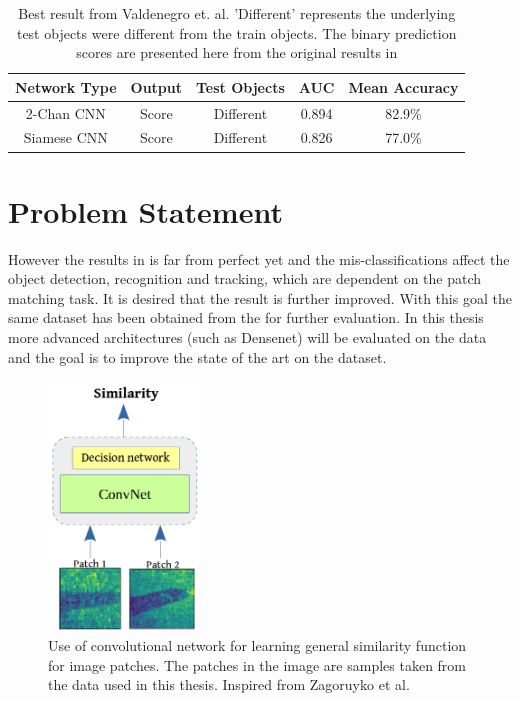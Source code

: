 \begin{table}
\centering
 \begin{tabular}{|c c c c c|} 
 \hline\hline
 Network Type & Output & Test Objects & AUC & Mean Accuracy \\ [0.5ex] 
 \hline
 2-Chan CNN & Score & Different & 0.894 & 82.9\% \\ 
 \hline
 Siamese CNN & Score & Different & 0.826 & 77.0\% \\
 \hline \hline
\end{tabular}
\caption{Best result from Valdenegro et. al. 'Different' represents the underlying test objects were different from the train objects. The binary prediction scores are presented here from the original 
results in \cite{stateoftheart}}
\label{best_results_stateoftheart}
\end{table}

\newpage

\section{Problem Statement}
However the results in \cite{stateoftheart} is far from perfect yet and the mis-classifications affect the object detection, recognition and tracking, 
which are dependent on the patch matching task. It is desired that the result is further improved. With this goal the same dataset has been obtained from the \cite{stateoftheart} for further evaluation.
In this thesis more advanced architectures (such as Densenet) \cite{densenet} will be evaluated on the data and the goal is to improve the state of the art on the dataset. 


\begin{figure}
\hspace{1cm}
\includegraphics[width=4cm]{images/densenet/similarity_fn}
\caption{Use of convolutional network for learning general similarity function for image patches. The patches in the image are samples taken from the data used in this thesis. 
Inspired from Zagoruyko et al.\cite{zagoruyko2015learning}}
\label{similarity_function_wraped}
\end{figure} 

